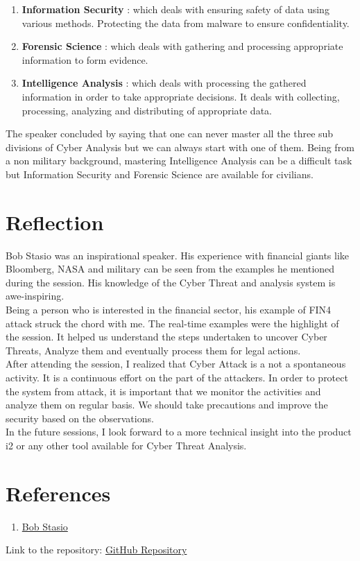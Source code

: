 \documentclass{article}
\begin{document}
\begin{enumerate}
\item \textbf{ Information Security} : which deals with ensuring safety of data using various methods. Protecting the data from malware  to ensure confidentiality.
\item \textbf{ Forensic Science} : which deals with gathering and processing appropriate information to form evidence.
\item \textbf{ Intelligence Analysis} :  which deals with processing the gathered information in order to take appropriate decisions. It deals with collecting, processing, analyzing and distributing of appropriate data. \\
\end{enumerate}

The speaker concluded by saying that one can never master all the three sub divisions of Cyber Analysis but we can always start with one of them. Being from a non military background, mastering Intelligence Analysis can be a difficult task but Information Security and Forensic Science are available for civilians. 

\section*{Reflection}

Bob Stasio was an inspirational speaker. His experience with financial giants like Bloomberg, NASA and military can be seen from the examples he mentioned during the session. His knowledge of the Cyber Threat and analysis system is awe-inspiring.\\

Being a person who is interested in the financial sector, his example of FIN4 attack struck the chord with me. The real-time examples were the highlight of the session. It helped us understand the steps undertaken to uncover Cyber Threats, Analyze them and eventually process them for legal actions.\\

After attending the session, I realized that Cyber Attack is a not a spontaneous activity. It is a continuous effort on the part of the attackers. In order to protect the system from attack, it is important that we monitor the activities and analyze them on regular basis. We should take precautions and improve the security based on the observations.\\

In the future sessions, I look forward to a more technical insight into the product i2 or any other tool available for Cyber Threat Analysis.\\

 
\section*{References}

\begin{enumerate}
\item  \href{http://www.fierceitsecurity.com/tags/cyber-analysis}{Bob Stasio}\\
\end{enumerate}


Link to the repository:  \href{https://github.com/rsaranya/SecurityAlgorithm.git}{GitHub Repository}
\end{document}
